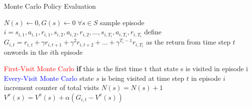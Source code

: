\begin{algorithm}[H]
  \large
    \caption{Monte Carlo Policy Evaluation }\label{MCPE}
    \begin{algorithmic}
        \STATE $N(s)\gets 0, G(s)\gets 0 \; \forall s \in S$
        \FOR{}
        \STATE sample episode $i = s_{i,1},a_{i,1},r_{i,1},s_{i,2},a_{i,2},r_{i,2},\dots,s_{i,T_i},a_{i,T_i},r_{i,T_i}$ \vskip 5pt
        \STATE define $G_{i,t} = r_{i,t}+ \gamma  r_{i,t+1} + \gamma^2  r_{i,t+2} + \dots +  \gamma^{T_i -1}  r_{i,T_i} $ as the return from time step $t$ onwords in the $i$th episode \vskip 5pt
         \vskip 3pt

        \STATE {} \textcolor{red}{First-Visit Monte Carlo} 
        \STATE \textbf{if} this is the first time t that state s is visited in episode i
        \STATE
        \STATE {} \textcolor{blue}{Every-Visit Monte Carlo}
        \STATE state $s$ is being visited at time step $t$ in episode $i$
        \STATE
        \STATE increment counter of total visits $N(s) = N(s)+1$
        \STATE  $V^{\pi}(s)= V^{\pi}(s) + \alpha(G_{i,t}- V^{\pi}(s))$ 
        
        
        
        \ENDFOR
        \ENDFOR

    \end{algorithmic}
\end{algorithm}
